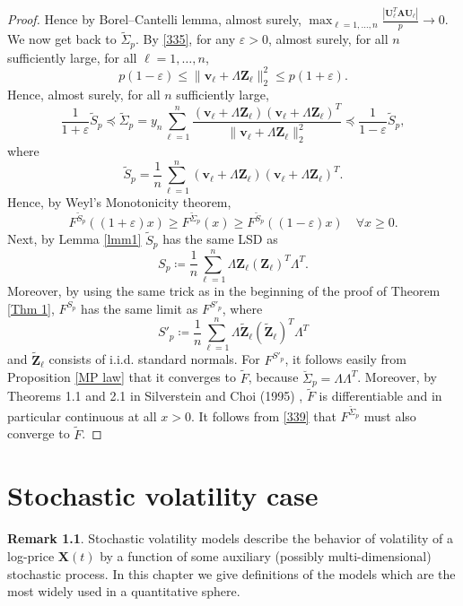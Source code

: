 \documentclass[a4paper,11pt]{book}
\theoremstyle{plain}
\theoremstyle{definition}
\newtheorem{rmrk}[thm]{Remark}
\begin{document}
\begin{proof}
    	 Hence by Borel–Cantelli lemma, almost surely, $\max_{\ell = 1, \dots, n} \frac{| \mathbf{U}_\ell^T \mathbf{A} \mathbf{U}_\ell |}{p} \rightarrow 0$.
    	 We now get back to $\widetilde{\Sigma}_p$. By \eqref{335}, for any $\varepsilon > 0$, almost surely, for all $n$ sufficiently large, for all $\ell = 1, \dots, n$,
    	 \[ p(1-\varepsilon) \leq \| \mathbf{v}_\ell + \Lambda \mathbf{Z}_\ell \|_2^2 \leq p(1+\varepsilon). \]
    	 Hence, almost surely, for all $n$ sufficiently large,
    	 \[ \frac{1}{1+\varepsilon} \widetilde{S}_p \preceq \widetilde{\Sigma}_p = y_n \sum_{\ell=1}^{n} \frac{(\mathbf{v}_\ell + \Lambda \mathbf{Z}_\ell) (\mathbf{v}_\ell + \Lambda \mathbf{Z}_\ell)^T}{\|\mathbf{v}_\ell + \Lambda \mathbf{Z}_\ell\|_2^2} \preceq \frac{1}{1-\varepsilon} \widetilde{S}_p, \]
    	 where
    	 \[  \widetilde{S}_p = \frac{1}{n}\sum_{\ell=1}^{n} (\mathbf{v}_\ell + \Lambda \mathbf{Z}_\ell) (\mathbf{v}_\ell + \Lambda \mathbf{Z}_\ell)^T. \]
    	 Hence, by Weyl's Monotonicity theorem,
    	 \begin{equation} \label{339}
    	     F^{\widetilde{S}_p}((1+\varepsilon)x) \geq F^{\widetilde{\Sigma}_p}(x) \geq F^{\widetilde{S}_p}((1-\varepsilon)x) \quad \forall x \geq 0.
    	 \end{equation}
    	 Next, by Lemma \ref{lmm1} $\widetilde{S}_p$ has the same LSD as 
    	 \[S_p \coloneqq \frac{1}{n} \sum_{\ell=1}^{n} \Lambda \mathbf{Z}_\ell (\mathbf{Z}_\ell)^T \Lambda^T.\]
    	 Moreover, by using the same trick as in the beginning of the proof of Theorem \ref{Thm 1}, $F^{S_p}$ has the same limit as $F^{S'_p}$, where
    	 \[S'_p \coloneqq \frac{1}{n} \sum_{\ell=1}^{n} \Lambda \widetilde{\mathbf{Z}}_\ell (\widetilde{\mathbf{Z}}_\ell)^T \Lambda^T\]
    	 and $\widetilde{\mathbf{Z}}_\ell$ consists of i.i.d. standard normals. For $F^{S'_p}$, it follows easily from Proposition \ref{MP law} that it converges to $\widetilde{F}$, because $\breve{\Sigma}_p = \Lambda \Lambda^T$. Moreover, by Theorems 1.1 and 2.1 in Silverstein and Choi (1995) \cite{SilversteinChoi}, $\widetilde{F}$ is differentiable and in particular continuous at all $x > 0$. It follows from \eqref{339} that $F^{\widetilde{\Sigma}_p}$ must also converge to $\widetilde{F}$.
    \end{proof}
    
    
    \chapter{Stochastic volatility case}
    \begin{rmrk}
    	Stochastic volatility models describe the behavior of volatility of a log-price $\mathbf{X}(t)$ by a function of some auxiliary (possibly multi-dimensional) stochastic process. In this chapter we give definitions of the models which are the most widely used in a quantitative sphere.
    \end{rmrk}
    
\end{document}
